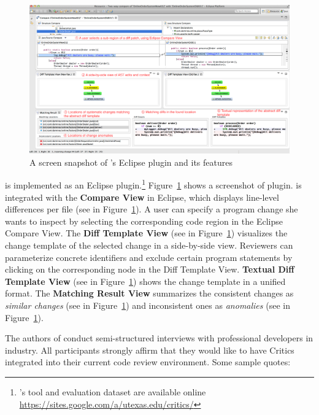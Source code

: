 \documentclass[11pt]{article}
\begin{document}
\begin{figure}[ht]
 \centering
 \includegraphics[width=\textwidth]{critics-UI.pdf}
 \caption{A screen snapshot of {\critics}'s Eclipse plugin and its features}
 \label{fig:critics-UI}
\end{figure}

{\critics} is implemented as an Eclipse plugin.\footnote{{\critics}'s tool and evaluation dataset are available online \url{https://sites.google.com/a/utexas.edu/critics/}} Figure~\ref{fig:critics-UI} shows a screenshot of {\critics} plugin. {\critics} is integrated with the {\bf Compare View} in Eclipse, which displays line-level differences per file (see  in Figure~\ref{fig:critics-UI}). A user can specify a program change she wants to inspect by selecting the corresponding code region in the Eclipse Compare View. The {\bf Diff Template View} (see  in Figure~\ref{fig:critics-UI}) visualizes the change template of the selected change in a side-by-side view. Reviewers can parameterize concrete identifiers and exclude certain program statements by clicking on the corresponding node in the Diff Template View. {\bf Textual Diff Template View} (see  in Figure~\ref{fig:critics-UI}) shows the change template in a unified format. The {\bf Matching Result View} summarizes the consistent changes as {\em similar changes} (see  in Figure~\ref{fig:critics-UI}) and inconsistent ones as {\em anomalies} (see  in Figure~\ref{fig:critics-UI}).

The authors of {\critics} conduct semi-structured interviews with professional developers in industry. All participants strongly affirm that they would like to have Critics integrated into their current code
review environment. Some sample quotes:

\end{document}
